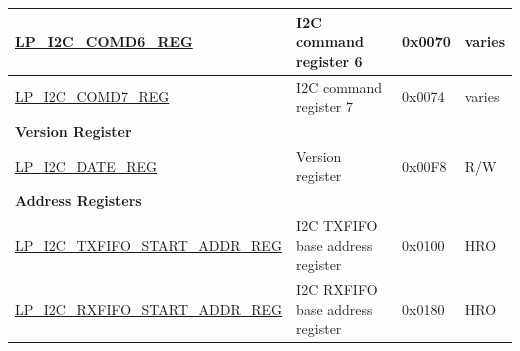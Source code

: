 \begin{longtable}{ | p{6cm} | p{7.2cm} | p{1.3cm} | p{1cm} | }
\hyperref[regdesc:LPI2CCOMD6REG]{LP\_I2C\_COMD6\_REG} & I2C command register 6 & 0x0070 & varies \\ \hline
\hyperref[regdesc:LPI2CCOMD7REG]{LP\_I2C\_COMD7\_REG} & I2C command register 7 & 0x0074 & varies \\ \hline
\multicolumn{4}{|l|}{\textbf{Version Register}} \\ \hline
\hyperref[regdesc:LPI2CDATEREG]{LP\_I2C\_DATE\_REG} & Version register & 0x00F8 & R/W \\ \hline
\multicolumn{4}{|l|}{\textbf{Address Registers}} \\ \hline
\hyperref[regdesc:LPI2CTXFIFOSTARTADDRREG]{LP\_I2C\_TXFIFO\_START\_ADDR\_REG} & I2C TXFIFO base address register & 0x0100 & HRO \\ \hline
\hyperref[regdesc:LPI2CRXFIFOSTARTADDRREG]{LP\_I2C\_RXFIFO\_START\_ADDR\_REG} & I2C RXFIFO base address register & 0x0180 & HRO \\ \hline
\end{longtable}
